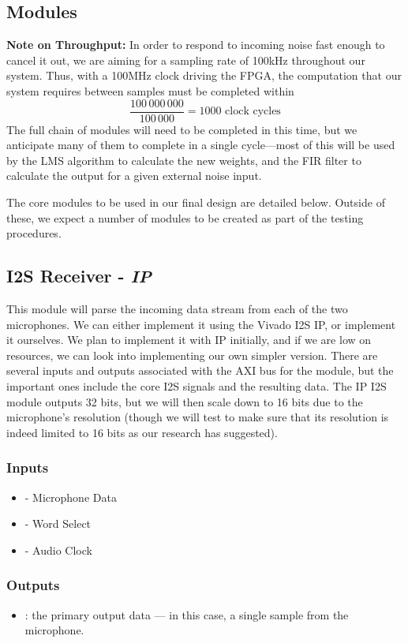 \documentclass{fpgairpods}
\begin{document}
\newpage
\begin{multicols*}{2}
\section{Modules}
\textbf{Note on Throughput:} In order to respond to incoming noise fast enough to cancel it out, we are aiming for a sampling rate of 100kHz throughout our system. Thus, with a 100MHz clock driving the FPGA, the computation that our system requires between samples must be completed within
\[ \frac{100\,000\,000}{100\,000} = 1000 \text{ clock cycles} \]
The full chain of modules will need to be completed in this time, but we anticipate many of them to complete in a single cycle---most of this will be used by the LMS algorithm to calculate the new weights, and the FIR filter to calculate the output for a given external noise input.

The core modules to be used in our final design are detailed below. Outside of these, we expect a number of modules to be created as part of the testing procedures.


\subsection{I2S Receiver - \textit{IP}}
This module will parse the incoming data stream from each of the two microphones. We can either implement it using the Vivado I2S IP, or implement it ourselves. We plan to implement it with IP initially, and if we are low on resources, we can look into implementing our own simpler version. There are several inputs and outputs associated with the AXI bus for the module, but the important ones include the core I2S signals and the resulting data. The IP I2S module outputs 32 bits, but we will then scale down to 16 bits due to the microphone's resolution (though we will test to make sure that its resolution is indeed limited to 16 bits as our research has suggested). 
\subsubsection{Inputs}
\begin{itemize}
    \item {} - Microphone Data
    \item {} - Word Select
    \item {} - Audio Clock
\end{itemize}
\subsubsection{Outputs}
\begin{itemize}
    \item {}: the primary output data --- in this case, a single sample from the microphone.
\end{itemize}

\end{multicols*}
\end{document}
